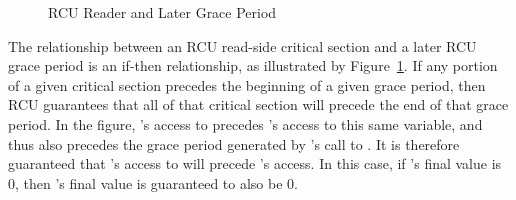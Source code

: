 \begin{figure}[tbp]
\centering
{}
\caption{RCU Reader and Later Grace Period}
\label{fig:defer:RCU Reader and Later Grace Period}
\end{figure}

The relationship between an RCU read-side critical section and a later
RCU grace period is an if-then relationship, as illustrated by
Figure~\ref{fig:defer:RCU Reader and Later Grace Period}.
If any portion of a given critical section precedes the beginning of
a given grace period, then RCU guarantees that all of that critical
section will precede the end of that grace period.
In the figure, 's access to  precedes 's access
to this same variable, and thus also precedes the grace period generated
by 's call to .
It is therefore guaranteed that 's access to  will precede
's access.
In this case, if 's final value is 0, then 's final value
is guaranteed to also be 0.

\QuickQuizEnd

